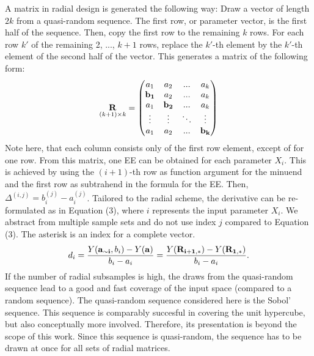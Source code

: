 \documentclass[a4paper,12pt]{article}
\begin{document}
\noindent
A matrix in radial design is generated the following way: Draw a vector of length $2k$ from a quasi-random sequence. The first row, or parameter vector, is the first half of the sequence. Then, copy the first row to the remaining $k$ rows. For each row $k'$ of the remaining 2, ..., $k+1$ rows, replace the $k'$-th element by the $k'$-th element of the second half of the vector. This generates a matrix of the following form:
\begin{align}
\underset{(k+1)\times k}{\bold{R}} =
\begin{pmatrix}
a_1 & a_2 & ... & a_k \\
\bold{b_1} & a_2 & ... & a_k \\
a_1 & \bold{b_2} & ... & a_k \\
\vdots & \vdots & 	\ddots & \vdots\\
a_1 & a_2 & ... & \bold{b_k}
\end{pmatrix}
\end{align}
\noindent
Note here, that each column consists only of the first row element, except of for one row.
From this matrix, one EE can be obtained for each parameter $X_i$. This is achieved by using the $(i+1)$-th row as function argument for the minuend and the first row as subtrahend in the formula for the EE. Then, $\Delta^{(i,j)} = b_i^{(j)} - a_i^{(j)}$. Tailored to the radial scheme, the derivative can be re-formulated as in Equation (3), where $i$ represents the input parameter $X_i$. We abstract from multiple sample sets and do not use index $j$ compared to Equation (3). The asterisk is an index for a complete vector.
\begin{align}
d_i =  \frac{Y(\bold{a_{\sim i}}, b_i) - Y(\bold{a})}{b_i - a_i} = \frac{Y(\bold{R_{i+1,*}}) -  Y(\bold{R_{1,*}})}{b_i - a_i}.
\end{align}
If the number of radial subsamples is high, the draws from the quasi-random sequence lead to a good and fast coverage of the input space (compared to a random sequence). The quasi-random sequence considered here is the Sobol' sequence. This sequence is comparably succesful in covering the unit hypercube, but also conceptually more involved. Therefore, its presentation is beyond the scope of this work. Since this sequence is quasi-random, the sequence has to be drawn at once for all sets of radial matrices.\\
\end{document}

